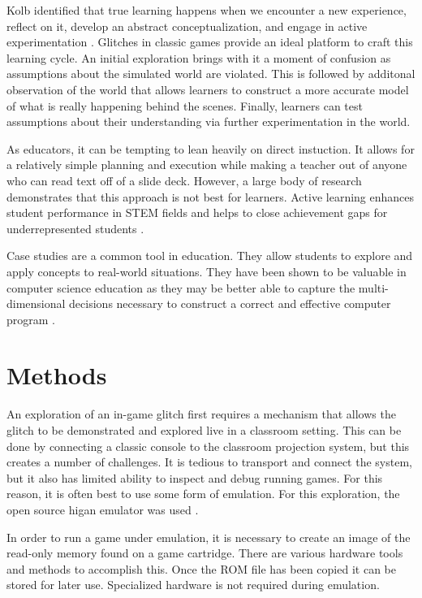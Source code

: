 \documentclass[letterpaper]{article}
\begin{document}
Kolb identified that true learning happens when we encounter a new experience, reflect on it, develop an abstract conceptualization, and engage in active experimentation \cite{kolb84}. Glitches in classic games provide an ideal platform to craft this learning cycle. An initial exploration brings with it a moment of confusion as assumptions about the simulated world are violated. This is followed by additonal observation of the world that allows learners to construct a more accurate model of what is really happening behind the scenes. Finally, learners can test assumptions about their understanding via further experimentation in the world.

As educators, it can be tempting to lean heavily on direct instuction. It allows for a relatively simple planning and execution while making a teacher out of anyone who can read text off of a slide deck. However, a large body of research demonstrates that this approach is not best for learners. Active learning enhances student performance in STEM fields \cite{freeman2014active} and helps to close achievement gaps for underrepresented students \cite{theobald2020active}.

Case studies are a common tool in education. They allow students to explore and apply concepts to real-world situations. They have been shown to be valuable in computer science education as they may be better able to capture the multi-dimensional decisions necessary to construct a correct and effective computer program \cite{linn1992case}.

\section{Methods}
An exploration of an in-game glitch first requires a mechanism that allows the glitch to be demonstrated and explored live in a classroom setting. This can be done by connecting a classic console to the classroom projection system, but this creates a number of challenges. It is tedious to transport and connect the system, but it also has limited ability to inspect and debug running games. For this reason, it is often best to use some form of emulation. For this exploration, the open source higan emulator was used \cite{ginder2004higan}.

In order to run a game under emulation, it is necessary to create an image of the read-only memory found on a game cartridge. There are various hardware tools and methods to accomplish this. Once the ROM file has been copied it can be stored for later use. Specialized hardware is not required during emulation.
\end{document}
